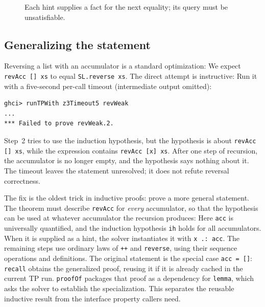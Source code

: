 \documentclass[acmsmall,screen,review,anonymous,nonacm]{acmart}
\newcommand{\code}[1]{\texttt{#1}}
\begin{document}
\begin{figure}[htbp]
\centering
{}
\caption{Each hint supplies a fact for the next equality; its query must be unsatisfiable.}
\label{fig:calculation}
\end{figure}

\subsection{Generalizing the statement}

Reversing a list with an accumulator is a standard optimization:
We expect \code{revAcc [] xs} to equal \code{SL.reverse xs}. The direct attempt
is instructive:
Run it with a five-second per-call timeout (intermediate output omitted):
\begin{lstlisting}[style=output]
ghci> runTPWith z3Timeout5 revWeak
...
*** Failed to prove revWeak.2.
\end{lstlisting}
Step~2 tries to use the induction hypothesis, but the hypothesis is about
\code{revAcc [] xs}, while the expression contains \code{revAcc [x] xs}. After
one step of recursion, the accumulator is no longer empty, and the hypothesis says
nothing about it. The timeout leaves the statement unresolved; it does not
refute reversal correctness.

The fix is the oldest trick in inductive proofs: prove a more general statement.
The theorem must describe \code{revAcc} for \emph{every} accumulator, so that the
hypothesis can be used at whatever accumulator the recursion produces:
Here \code{acc} is universally quantified, and the induction hypothesis
\code{ih} holds for all accumulators. When it is supplied as a hint, the solver
instantiates it with \code{x .: acc}. The remaining steps use ordinary laws of
\code{++} and \code{reverse}, using their sequence operations and definitions.
The original statement is the special case \code{acc = []}:
\code{recall} obtains the generalized proof, reusing it if it is already cached
in the current TP run. \code{proofOf} packages that proof as a dependency for
\code{lemma}, which asks the solver to establish the specialization. This
separates the reusable inductive result from the interface property callers need.
\end{document}
